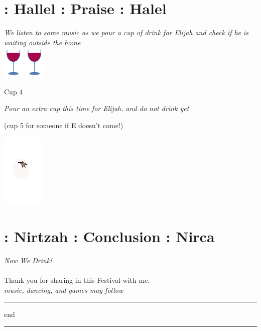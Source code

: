 \documentclass[a5paper,10pt]{memoir}
\begin{document}
\section{ : Hallel : Praise : Halel}
{\textit{\color{midblue} We listen to some music as we pour a cup of drink for Elijah and check if he is waiting outside the home}\\
\color{black}
\Hallel
\vspace*{2ex}
{\hspace*{100mm} \includegraphics[width=10mm]{cup} \includegraphics[width=10mm]{cup}}
\vspace*{-15ex}  %
\begin{center}
	\noindent \large \color{midblue} Cup 4
\end{center}
\textit{\color{midblue} Pour an extra cup this time for Elijah, and do not drink yet}
\Kaddeish
\vspace*{2ex}
\Elijah
\begin{center}
	(cup 5 for someone if E doesn't come!)\\
	\end{center}
}
% 
\onecolumn
\hfill\includegraphics[width=20mm]{Beitza}
\vspace*{-19ex}  %
\section{ : Nirtzah : Conclusion : Nirca}
\Nirtzah
% 
\vspace*{4ex}
\textit{\large Now We Drink!}\\
\vspace*{4ex}
\\Thank you for sharing in this Festival with me.
\vspace*{4ex}\\
\textit{music, dancing, and games may follow}
\vfill
{\color{cyan} \rule{\linewidth}{0.5mm}}
\vspace*{2ex}
\begin{center}
	{end}
\end{center}
\vspace*{2ex}
{\color{cyan} \rule{\linewidth}{0.5mm}}

\end{document}
